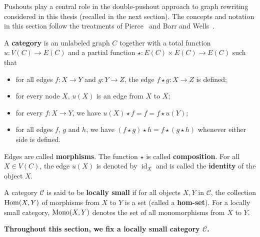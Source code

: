 Pushouts play a central role in the double-pushout approach to graph rewriting considered in this thesis (recalled in the next section). The concepts and notation in this section follow the treatments of Pierce~\cite{pierce1991basic} and Barr and Wells~\cite{barr1990category}.
\begin{definition}
    \label{def:cat}
    A \textbf{category} is an unlabeled graph \( C \) together with a total function \( u : V(C)  \mathop{\to} E(C) \) and a partial function \( \star: E(C) \mathop{\times} E(C)  \mathop{\to} E(C) \) such that 
        \begin{itemize}
            \item for all edges \( f:X  \mathop{\to} Y \) and \( g:Y  \mathop{\to} Z \), the edge \( f \mathop{\star} g :X  \mathop{\to} Z \) is defined; 
            \item  for every node \( X \), \( u(X) \) is an edge from \( X \) to \( X \); 
            \item for every \( f:X  \mathop{\to} Y \), we have \(u(X) \mathop{\star} f \mathop{=} f \mathop{=} f \mathop{\star} u(Y)\);
            \item for all edges \( f \), \( g \) and \(h\), we have \( (f \mathop{\star} g) \mathop{\star} h \mathop{=} f \mathop{\star} (g \mathop{\star} h) \) whenever either side is defined.
        \end{itemize}
    Edges are called \textbf{morphisms}. The function $\star$ is called \textbf{composition}. For all \( X \mathop{\in} V(C) \), the edge \( u(X) \) is denoted by \( \operatorname{id}_X \) and is called the \textbf{identity} of the object \( X \).
\end{definition}    
\begin{definition}
    A category \(\mathcal{C}\) is said to be \textbf{locally small} if for all objects \(X,Y\) in \(\mathcal{C}\), the collection $\operatorname{Hom}(X,Y)$ of morphisms from \(X\) to \(Y\) is a set (called a \textbf{hom-set}). For a locally small category, $\operatorname{Mono}(X,Y)$ denotes the set of all monomorphisms from $X$ to $Y$.
\end{definition}
\textbf{Throughout this section, we fix a locally small category \( \mathcal{C} \).}
